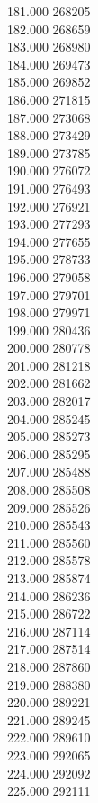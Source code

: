 { 181.000	268205 \\
 182.000	268659 \\
 183.000	268980 \\
 184.000	269473 \\
 185.000	269852 \\
 186.000	271815 \\
 187.000	273068 \\
 188.000	273429 \\
 189.000	273785 \\
 190.000	276072 \\
 191.000	276493 \\
 192.000	276921 \\
 193.000	277293 \\
 194.000	277655 \\
 195.000	278733 \\
 196.000	279058 \\
 197.000	279701 \\
 198.000	279971 \\
 199.000	280436 \\
 200.000	280778 \\
 201.000	281218 \\
 202.000	281662 \\
 203.000	282017 \\
 204.000	285245 \\
 205.000	285273 \\
 206.000	285295 \\
 207.000	285488 \\
 208.000	285508 \\
 209.000	285526 \\
 210.000	285543 \\
 211.000	285560 \\
 212.000	285578 \\
 213.000	285874 \\
 214.000	286236 \\
 215.000	286722 \\
 216.000	287114 \\
 217.000	287514 \\
 218.000	287860 \\
 219.000	288380 \\
 220.000	289221 \\
 221.000	289245 \\
 222.000	289610 \\
 223.000	292065 \\
 224.000	292092 \\
 225.000	292111 \\
}
